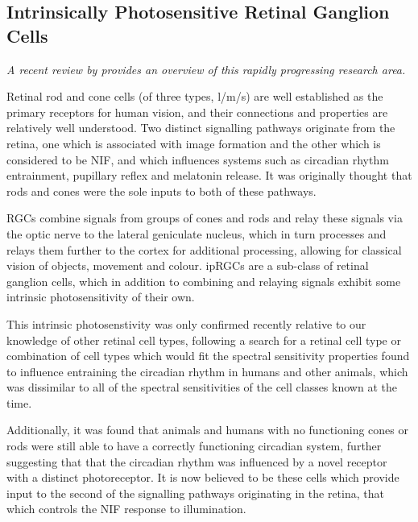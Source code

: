 \subsection{Intrinsically Photosensitive Retinal Ganglion Cells}

\textit{A recent review by \citet{spitschan_melanopsin_2019} provides an overview of this rapidly progressing research area.}

\bigskip

Retinal rod and cone cells (of three types, l/m/s) are well established as the primary receptors for human vision, and their connections and properties are relatively well understood. Two distinct signalling pathways originate from the retina, one which is associated with image formation and the other which is considered to be \gls{NIF}, and which influences systems such as circadian rhythm entrainment, pupillary reflex and melatonin release. It was originally thought that rods and cones were the sole inputs to both of these pathways\citep{hankins_melanopsin_2008}.

\Glspl{RGC} combine signals from groups of cones and rods and relay these signals via the optic nerve to the lateral geniculate nucleus, which in turn processes and relays them further to the cortex for additional processing, allowing for classical vision of objects, movement and colour. \Glspl{ipRGC} are a sub-class of retinal ganglion cells, which in addition to combining and relaying signals exhibit some intrinsic photosensitivity of their own. 

This intrinsic photosenstivity was only confirmed recently\citep{qiu_induction_2005} relative to our knowledge of other retinal cell types, following a search for a retinal cell type or combination of cell types which would fit the spectral sensitivity properties found to influence entraining the circadian rhythm in humans and other animals\citep{brainard_human_2001,brainard_action_2001}, which was dissimilar to all of the spectral sensitivities of the cell classes known at the time.

Additionally, it was found that animals and humans with no functioning cones or rods were still able to have a correctly functioning circadian system\citep{freedman_regulation_1999,zaidi_short-wavelength_2007}, further suggesting that that the circadian rhythm was influenced by a novel receptor with a distinct photoreceptor. It is now believed to be these cells which provide input to the second of the signalling pathways originating in the retina, that which controls the \gls{NIF} response to illumination.

